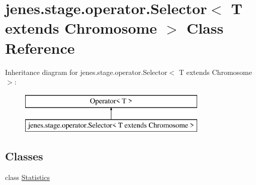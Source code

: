 \hypertarget{classjenes_1_1stage_1_1operator_1_1_selector_3_01_t_01extends_01_chromosome_01_4}{\section{jenes.\-stage.\-operator.\-Selector$<$ T extends Chromosome $>$ Class Reference}
\label{classjenes_1_1stage_1_1operator_1_1_selector_3_01_t_01extends_01_chromosome_01_4}
}
Inheritance diagram for jenes.\-stage.\-operator.\-Selector$<$ T extends Chromosome $>$\-:\begin{figure}[H]
\begin{center}
\leavevmode
\includegraphics[height=2.000000cm]{classjenes_1_1stage_1_1operator_1_1_selector_3_01_t_01extends_01_chromosome_01_4}
\end{center}
\end{figure}
\subsection*{Classes}
\begin{DoxyCompactItemize}
\item 
class \hyperlink{classjenes_1_1stage_1_1operator_1_1_selector_3_01_t_01extends_01_chromosome_01_4_1_1_statistics}{Statistics}
\end{DoxyCompactItemize}
